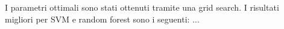 I parametri ottimali sono stati ottenuti tramite una grid search. I risultati migliori per SVM e random forest sono i seguenti: ...